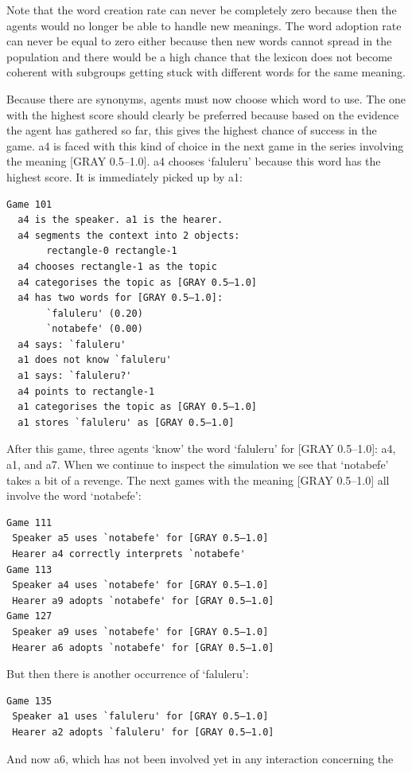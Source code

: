 Note that the word creation 
rate can never be completely zero because then the agents
would no longer be able to handle new meanings. The word 
adoption rate can never be equal to zero either because then 
new words cannot spread in the population and there
would be a high chance that the lexicon does not become coherent
with subgroups getting stuck with different
words for the same meaning. 

Because there are synonyms, agents must now choose
which word to use. The one with the highest
score should clearly be preferred because based on the
evidence the agent has gathered so far, this
gives the highest chance of success in the game. {\bfshape  a4}
is faced with this kind of choice in 
the next game in the series involving the meaning
{}[GRAY 0.5–1.0]. {\bfshape  a4} chooses `faluleru' because this 
word has the highest score. It is immediately picked up by 
{\bfshape  a1}: 
\begin{verbatim}
Game 101
  a4 is the speaker. a1 is the hearer. 
  a4 segments the context into 2 objects: 
       rectangle-0 rectangle-1
  a4 chooses rectangle-1 as the topic 
  a4 categorises the topic as [GRAY 0.5–1.0]
  a4 has two words for [GRAY 0.5–1.0]:
       `faluleru' (0.20)
       `notabefe' (0.00)
  a4 says: `faluleru'
  a1 does not know `faluleru'
  a1 says: `faluleru?'
  a4 points to rectangle-1
  a1 categorises the topic as [GRAY 0.5–1.0]
  a1 stores `faluleru' as [GRAY 0.5–1.0]
\end{verbatim}
After this game, three agents `know' the word 
`faluleru' for [GRAY 0.5–1.0]: {\bfshape  a4}, {\bfshape  a1}, 
and {\bfshape  a7}. When we continue to inspect the
simulation we see that `notabefe' takes a bit of 
a revenge. The next games with the 
meaning [GRAY 0.5–1.0] all involve the word `notabefe': 
\begin{verbatim}
Game 111
 Speaker a5 uses `notabefe' for [GRAY 0.5–1.0]
 Hearer a4 correctly interprets `notabefe'
Game 113
 Speaker a4 uses `notabefe' for [GRAY 0.5–1.0]
 Hearer a9 adopts `notabefe' for [GRAY 0.5–1.0]
Game 127
 Speaker a9 uses `notabefe' for [GRAY 0.5–1.0]
 Hearer a6 adopts `notabefe' for [GRAY 0.5–1.0]
\end{verbatim}
But then there is another occurrence of `faluleru': 
\begin{verbatim}
Game 135 
 Speaker a1 uses `faluleru' for [GRAY 0.5–1.0]
 Hearer a2 adopts `faluleru' for [GRAY 0.5–1.0]
\end{verbatim}
And now {\bfshape  a6}, which has not been involved 
yet in any interaction concerning the 
